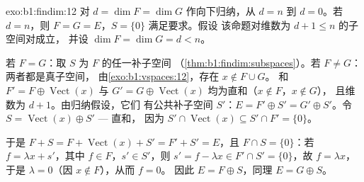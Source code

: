\begin{solution}{exo:b1:findim:12}
对 $d = \dim F = \dim G$ 作向下归纳，从 $d = n$ 到 $d =
0$。若 $d = n$，则 $F = G = E$，$S = \{0\}$ 满足要求。假设
该命题对维数为 $d + 1 \leq n$ 的子空间对成立，
并设 $\dim F = \dim G = d < n$。

若 $F = G$：取 $S$ 为 $F$ 的任一补子空间
（\cref{thm:b1:findim:subspaces}）。若 $F \neq G$：两者都是真子空间，
由\cref{exo:b1:vspaces:12}，存在 $x \notin F \cup G$。
和 $F' = F \oplus \operatorname{Vect}(x)$ 与 $G' = G \oplus
\operatorname{Vect}(x)$ 均为直和（$x \notin F$，$x \notin G$），
且维数为 $d + 1$。由归纳假设，它们
有公共补子空间 $S'$：$E = F' \oplus S' = G' \oplus
S'$。令 $S = \operatorname{Vect}(x) \oplus S'$ --- 直和，
因为 $S' \cap \operatorname{Vect}(x) \subseteq S' \cap F' =
\{0\}$。

于是 $F + S = F + \operatorname{Vect}(x) + S' = F' + S' = E$，且
$F \cap S = \{0\}$：若 $f = \lambda x + s'$，其中 $f \in F$，$s'
\in S'$，则 $s' = f - \lambda x \in F' \cap S' = \{0\}$，故 $f
= \lambda x$，于是 $\lambda = 0$（因 $x \notin F$），从而 $f = 0$。
因此 $E = F \oplus S$，同理 $E = G \oplus S$。
\end{solution}

